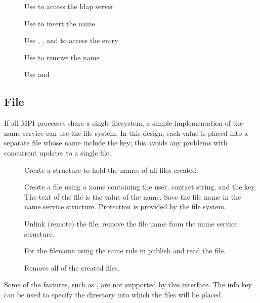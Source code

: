 \documentclass{article}
\begin{document}
\begin{description}
\item[]Use  to access the ldap server
\item[]Use  to insert the name
\item[]Use , , and
   to access the entry
\item[]Use  to remove the name
\item[]Use  and 
\end{description}

\subsection{File}
\label{sec:namepub-file}
If all MPI processes share a single filesystem, a simple
implementation of the name service can use the file system.  
In this design, each value is placed into a separate file whose name
include the key; this avoids
any problems with concurrent updates to a single file.
\begin{description}
\item[]Create a structure to hold the names of all files created.
\item[]Create a file using a name containing the user, contact
  string, and the key.  The text of the file is the value of the name.
  Save the file name in the name service structure.  Protection is
  provided by the file system.
\item[]Unlink (remote) the file; remove the file name from
  the name service structure.
\item[]For the filename using the same rule in publish and read
  the file.
\item[]Remove all of the created files.
\end{description}

Some of the features, such as , are not supported
by this interface.  The info key  can be used to
specify the directory into which the files will be placed.
\end{document}
